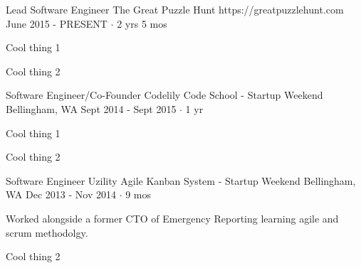 \documentclass[11pt, a4paper]{awesome-cv}
\begin{document}
\begin{cventries}

  \cventry
    {Lead Software Engineer} %
    {The Great Puzzle Hunt} %
    {https://greatpuzzlehunt.com} %
    {June 2015 - PRESENT $\cdot$ 2 yrs 5 mos} %
    {
      \begin{cvitems} %
        \item Cool thing 1
        \item Cool thing 2
      \end{cvitems}
    }
    {}

  \cventry
    {Software Engineer/Co-Founder} %
    {Codelily Code School - Startup Weekend} %
    {Bellingham, WA} %
    {Sept 2014 - Sept 2015 $\cdot$ 1 yr} %
    {
      \begin{cvitems} %
        \item Cool thing 1
        \item Cool thing 2
      \end{cvitems}
    }
    {}

  \cventry
    {Software Engineer} %
    {Uzility Agile Kanban System - Startup Weekend} %
    {Bellingham, WA} %
    {Dec 2013 - Nov 2014 $\cdot$ 9 mos} %
    {
      \begin{cvitems} %
        \item Worked alongside a former CTO of Emergency Reporting learning agile and scrum methodolgy.
        \item Cool thing 2
      \end{cvitems}
    }
    {}
\end{cventries}
\end{document}
